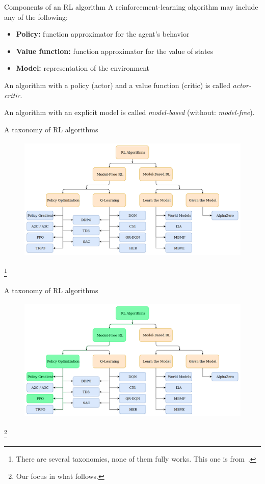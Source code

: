 \documentclass[10pt, aspectratio=1610]{beamer}
\newcommand\blfootnote[1]{%
  \begingroup
  \renewcommand\thefootnote{}%
  \footnote{#1}%
  \addtocounter{footnote}{-1}%
  \endgroup
}
\begin{document}
\begin{frame}{Components of an RL algorithm}
    A reinforcement-learning algorithm may include any of the following:
    \begin{itemize}
        \item \textbf{Policy:} function approximator for the agent's behavior
        \item \textbf{Value function:} function approximator for the value of states
        \item \textbf{Model:} representation of the environment
    \end{itemize}
    An algorithm with a policy (actor) and a value function (critic) is called \emph{actor-critic}.

    An algorithm with an explicit model is called \emph{model-based} (without: \emph{model-free}).
\end{frame}

\begin{frame}{A taxonomy of RL algorithms}
    \begin{figure}
        \includegraphics[height=6cm]{figures/taxonomy.png}
    \end{figure}
    \blfootnote{
        There are several taxonomies, none of them fully works. This one is from~\cite{spinningup}.
    }
\end{frame}

\begin{frame}{A taxonomy of RL algorithms}
    \begin{figure}
        \includegraphics[height=6cm]{figures/taxonomy-focus.png}
    \end{figure}
    \blfootnote{
        Our focus in what follows.
    }
\end{frame}
\end{document}
